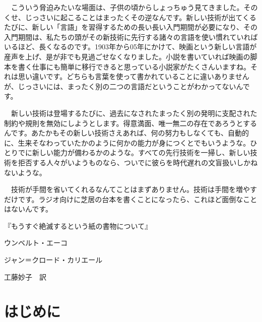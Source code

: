 \documentclass[8pt,b5paper,tombo,openany]{jsbook}
\begin{document}
\begin{center}
\begin{minipage}{0.3\hsize}
\begin{tiny}
　こういう脅迫みたいな場面は、子供の頃からしょっちゅう見てきました。そのくせ、じっさいに起こることはまったくその逆なんです。新しい技術が出てくるたびに、新しい「言語」を習得するための長い長い入門期間が必要になり、その入門期間は、私たちの頭がその新技術に先行する諸々の言語を使い慣れていればいるほど、長くなるのです。1903年から05年にかけて、映画という新しい言語が産声を上げ、是が非でも見過ごせなくなりました。小説を書いていれば映画の脚本を書く仕事にも簡単に移行できると思っている小説家がたくさんいますね。それは思い違いです。どちらも言葉を使って書かれていることに違いありませんが、じっさいには、まったく別の二つの言語だということがわかってないんです。

　新しい技術は登場するたびに、過去になされたまったく別の発明に支配された制約や規則を無効にしようとします。得意満面、唯一無二の存在であろうとするんです。あたかもその新しい技術さえあれば、何の努力もしなくても、自動的に、生来そなわっていたかのように何かの能力が身につくとでもいうような。ひとりでに新しい能力が備わるかのような。すべての先行技術を一掃し、新しい技術を拒否する人々がいようものなら、ついでに彼らを時代遅れの文盲扱いしかねないような。

　技術が手間を省いてくれるなんてことはまずありません。技術は手間を増やすだけです。ラジオ向けに芝居の台本を書くことになったら、これほど面倒なことはないんです。
\begin{flushright}
『もうすぐ絶滅するという紙の書物について』

ウンベルト・エーコ

ジャン＝クロード・カリエール

工藤妙子　訳
\end{flushright}
\end{tiny}
\end{minipage}
\end{center}

\newpage

\thispagestyle{empty}

\tableofcontents

\chapter{はじめに}

\setcounter{page}{1}
\end{document}
